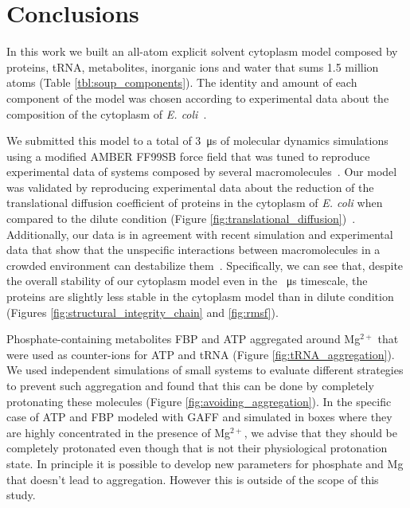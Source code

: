 \documentclass[journal=jacsat,manuscript=article]{achemso}
\begin{document}
\section*{Conclusions}\label{sec:concl}

In this work we built an all-atom explicit solvent cytoplasm model composed by proteins, tRNA, metabolites, inorganic ions and water that sums 1.5 million atoms (Table \ref{tbl:soup_components}). The identity and amount of each component of the model was chosen according to experimental data about the composition of the cytoplasm of \textit{E. coli}~\cite{Dong1996,Bennett2009,Link1997,Mcguffee2010}.

We submitted this model to a total of \SI{3}{\micro\second} of molecular dynamics simulations using a modified AMBER FF99SB force field that was tuned to reproduce experimental data of systems composed by several macromolecules~\cite{Best2014a}. Our model was validated by reproducing experimental data about the reduction of the translational diffusion coefficient of proteins in the cytoplasm of \textit{E. coli} when compared to the dilute condition (Figure \ref{fig:translational_diffusion})~\cite{Elowitz1999,Konopka2006}. Additionally, our data is in agreement with recent simulation and experimental data that show that the unspecific interactions between macromolecules in a crowded environment can destabilize them~\cite{Feig2011,miklos2011,Wang2012b}. Specifically, we can see that, despite the overall stability of our cytoplasm model even in the \SI{}{\micro\second} timescale, the proteins are slightly less stable in  the cytoplasm model than in dilute condition (Figures \ref{fig:structural_integrity_chain} and \ref{fig:rmsf}).


Phosphate-containing metabolites FBP and ATP aggregated around Mg$^{2+}$ that were used as counter-ions for ATP and tRNA (Figure \ref{fig:tRNA_aggregation}). We used independent simulations of small systems to evaluate different strategies to prevent such aggregation and found that this can be done by completely protonating these molecules (Figure \ref{fig:avoiding_aggregation}). In the specific case of ATP and FBP modeled with GAFF and simulated in boxes where they are highly concentrated in the presence of Mg$^{2+}$, we advise that they should be completely protonated even though that is not their physiological protonation state. In principle it is possible to develop new parameters for phosphate and Mg that doesn't lead to aggregation. However this is outside of the scope of this study.
\end{document}
